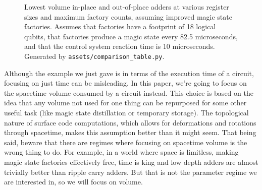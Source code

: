 \documentclass[onecolumn,unpublished]{quantumarticle}
\theoremstyle{definition}
\theoremstyle{definition}
\theoremstyle{definition}
\begin{document}
\begin{figure}
    \centering
    \caption{
        Lowest volume in-place and out-of-place adders at various register sizes and maximum factory counts, assuming improved magic state factories.
        Assumes that factories have a footprint of 18 logical qubits, that factories produce a magic state every 82.5 microseconds, and that the control system reaction time is 10 microseconds.
        Generated by \texttt{assets/comparison\_table.py}.
    }
    \label{fig:minioh}
\end{figure}

Although the example we just gave is in terms of the execution time of a circuit, focusing on just time can be misleading.
In this paper, we're going to focus on the spacetime volume consumed by a circuit instead.
This choice is based on the idea that any volume not used for one thing can be repurposed for some other useful task (like magic state distillation or temporary storage).
The topological nature of surface code computations, which allows for deformations and rotations through spacetime, makes this assumption better than it might seem.
That being said, beware that there are regimes where focusing on spacetime volume is the wrong thing to do.
For example, in a world where space is limitless, making magic state factories effectively free, time is king and low depth adders are almost trivially better than ripple carry adders.
But that is not the parameter regime we are interested in, so we will focus on volume.
\end{document}
